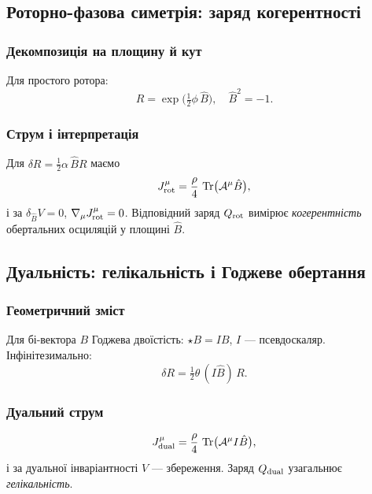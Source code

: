 \documentclass[11pt,a4paper]{article}
\numberwithin{equation}{section}
\theoremstyle{plain}
\theoremstyle{definition}
\theoremstyle{remark}
\DeclareMathOperator{\Tr}{Tr}
\begin{document}
\subsection{Роторно-фазова симетрія: заряд когерентності}

\subsubsection{Декомпозиція на площину й кут}

Для простого ротора:
\begin{equation}
R = \exp\!\big(\tfrac{1}{2}\phi\,\hat{B}\big),\quad \hat{B}^2=-1.
\end{equation}

\subsubsection{Струм і інтерпретація}

Для $\delta R=\tfrac{1}{2}\alpha\,\hat{B}R$ маємо
\begin{equation}
J^\mu_{\rm rot} = \frac{\rho}{4}\,\Tr\!\big(\mathcal{A}^\mu \hat{B}\big),
\label{eq:rotor-phase}
\end{equation}
і за $\delta_{\hat{B}}V=0$, $\nabla_\mu J^\mu_{\rm rot}=0$. Відповідний заряд $Q_{\rm rot}$ вимірює \emph{когерентність} обертальних осциляцій у площині $\hat{B}$.

\subsection{Дуальність: гелікальність і Годжеве обертання}

\subsubsection{Геометричний зміст}

Для бі-вектора $B$ Годжева двоїстість: $\star B=IB$, $I$ — псевдоскаляр. Інфінітезимально:
\begin{equation}
\delta R = \tfrac{1}{2}\theta\,(I\hat{B})\,R.
\end{equation}

\subsubsection{Дуальний струм}

\begin{equation}
J^\mu_{\rm dual} = \frac{\rho}{4}\,\Tr\!\big(\mathcal{A}^\mu I\hat{B}\big),
\label{eq:duality}
\end{equation}
і за дуальної інваріантності $V$ — збереження. Заряд $Q_{\rm dual}$ узагальнює \emph{гелікальність}.
\end{document}
